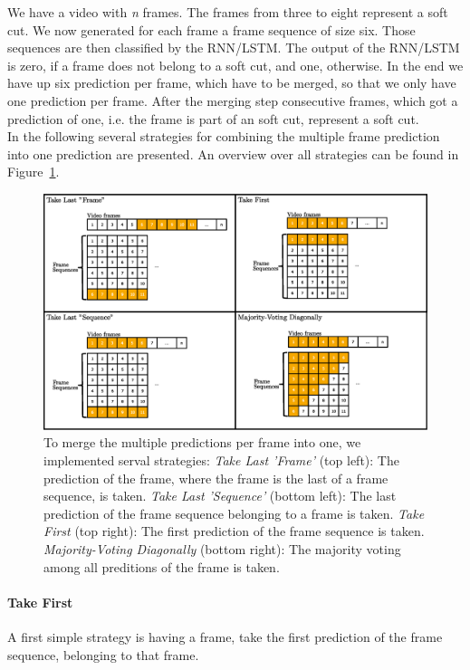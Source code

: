 We have a video with \textit{n} frames.
The frames from three to eight represent a soft cut.
We now generated for each frame a frame sequence of size six.
Those sequences are then classified by the RNN/LSTM.
The output of the RNN/LSTM is zero, if a frame does not belong to a soft cut, and one, otherwise.
In the end we have up six prediction per frame, which have to be merged, so that we only have one prediction per frame.
After the merging step consecutive frames, which got a prediction of one, i.e. the frame is part of an soft cut, represent a soft cut. \\
In the following several strategies for combining the multiple frame prediction into one prediction are presented.
An overview over all strategies can be found in Figure~\ref{fig:merging_strategies}.
\begin{figure}[!htb]
	\centering
	\includegraphics[scale=.5]{images/merging_strategies.eps}
	\caption{To merge the multiple predictions per frame into one, we implemented serval strategies: \textit{Take Last 'Frame'} (top left): The prediction of the frame, where the frame is the last of a frame sequence, is taken. \textit{Take Last 'Sequence'} (bottom left): The last prediction of the frame sequence belonging to a frame is taken. \textit{Take First} (top right): The first prediction of the frame sequence is taken. \textit{Majority-Voting Diagonally} (bottom right): The majority voting among all preditions of the frame is taken.}
	\label{fig:merging_strategies}
\end{figure}
\paragraph{Take First}
A first simple strategy is having a frame, take the first prediction of the frame sequence, belonging to that frame.

